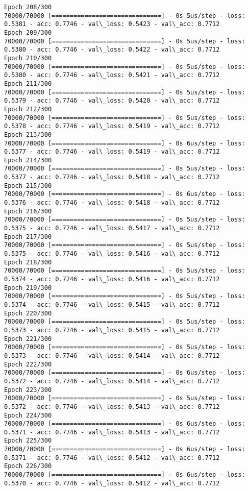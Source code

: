 \documentclass[11pt]{article}
\begin{document}
\begin{Verbatim}[commandchars=\\\{\}]
Epoch 208/300
70000/70000 [==============================] - 0s 5us/step - loss: 0.5381 - acc: 0.7746 - val\_loss: 0.5423 - val\_acc: 0.7712
Epoch 209/300
70000/70000 [==============================] - 0s 5us/step - loss: 0.5380 - acc: 0.7746 - val\_loss: 0.5422 - val\_acc: 0.7712
Epoch 210/300
70000/70000 [==============================] - 0s 5us/step - loss: 0.5380 - acc: 0.7746 - val\_loss: 0.5421 - val\_acc: 0.7712
Epoch 211/300
70000/70000 [==============================] - 0s 5us/step - loss: 0.5379 - acc: 0.7746 - val\_loss: 0.5420 - val\_acc: 0.7712
Epoch 212/300
70000/70000 [==============================] - 0s 5us/step - loss: 0.5378 - acc: 0.7746 - val\_loss: 0.5419 - val\_acc: 0.7712
Epoch 213/300
70000/70000 [==============================] - 0s 6us/step - loss: 0.5377 - acc: 0.7746 - val\_loss: 0.5419 - val\_acc: 0.7712
Epoch 214/300
70000/70000 [==============================] - 0s 5us/step - loss: 0.5377 - acc: 0.7746 - val\_loss: 0.5418 - val\_acc: 0.7712
Epoch 215/300
70000/70000 [==============================] - 0s 6us/step - loss: 0.5376 - acc: 0.7746 - val\_loss: 0.5418 - val\_acc: 0.7712
Epoch 216/300
70000/70000 [==============================] - 0s 5us/step - loss: 0.5375 - acc: 0.7746 - val\_loss: 0.5417 - val\_acc: 0.7712
Epoch 217/300
70000/70000 [==============================] - 0s 5us/step - loss: 0.5375 - acc: 0.7746 - val\_loss: 0.5416 - val\_acc: 0.7712
Epoch 218/300
70000/70000 [==============================] - 0s 5us/step - loss: 0.5374 - acc: 0.7746 - val\_loss: 0.5416 - val\_acc: 0.7712
Epoch 219/300
70000/70000 [==============================] - 0s 5us/step - loss: 0.5374 - acc: 0.7746 - val\_loss: 0.5415 - val\_acc: 0.7712
Epoch 220/300
70000/70000 [==============================] - 0s 5us/step - loss: 0.5373 - acc: 0.7746 - val\_loss: 0.5415 - val\_acc: 0.7712
Epoch 221/300
70000/70000 [==============================] - 0s 5us/step - loss: 0.5373 - acc: 0.7746 - val\_loss: 0.5414 - val\_acc: 0.7712
Epoch 222/300
70000/70000 [==============================] - 0s 6us/step - loss: 0.5372 - acc: 0.7746 - val\_loss: 0.5414 - val\_acc: 0.7712
Epoch 223/300
70000/70000 [==============================] - 0s 5us/step - loss: 0.5372 - acc: 0.7746 - val\_loss: 0.5413 - val\_acc: 0.7712
Epoch 224/300
70000/70000 [==============================] - 0s 6us/step - loss: 0.5371 - acc: 0.7746 - val\_loss: 0.5413 - val\_acc: 0.7712
Epoch 225/300
70000/70000 [==============================] - 0s 6us/step - loss: 0.5371 - acc: 0.7746 - val\_loss: 0.5412 - val\_acc: 0.7712
Epoch 226/300
70000/70000 [==============================] - 0s 6us/step - loss: 0.5370 - acc: 0.7746 - val\_loss: 0.5412 - val\_acc: 0.7712

\end{Verbatim}
\end{document}
